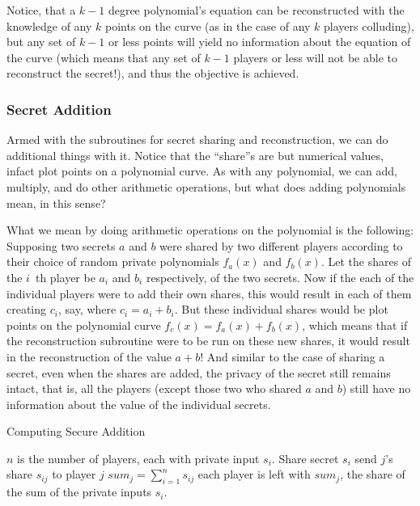 Notice, that
a $k-1$ degree polynomial's equation can be reconstructed with the knowledge
of any $k$ points on the curve (as in the case of any $k$ players colluding),
but any set of $k-1$ or less points will yield no information
about the equation of the curve (which means that any set of $k-1$ players
or less will not be able to reconstruct the secret!), and thus the objective
is achieved.

\subsubsection{Secret Addition}
\label{sec:add-prim}
Armed with the subroutines for secret sharing and reconstruction, we can
do additional things with it. Notice that the ``share''s are but 
numerical values, infact plot points on a polynomial curve. As with any 
polynomial, we can add, multiply, and do other arithmetic operations, but
what does adding polynomials mean, in this sense?

What we mean by doing arithmetic operations on the polynomial is the 
following:
Supposing two secrets $a$ and $b$ were shared by two different players
according to their choice of random private polynomials $f_{a}(x)$ and
$f_{b}(x)$. Let the shares of the $i$~th player be $a_i$ and $b_i$
respectively, of the two secrets. Now if the each of the individual players 
were to add their own shares, this would result in each of them creating
$c_i$, say, where $c_i = a_i + b_i$. But these individual shares 
would be plot points on the polynomial curve 
$f_{c}(x) = f_{a}(x) + f_{b}(x)$, which means that if the reconstruction
subroutine were to be run on these new shares, it would result in the 
reconstruction of the value $a+b$! And similar to the case of sharing 
a secret, even when the shares are added, the privacy of the secret still
remains intact, that is, all the players (except those two who shared $a$
and $b$) still have no information about the value of the individual secrets.

\begin{algorithm}
\caption{Computing Secure Addition}
\label{algadd}
\begin{algorithmic}
\REQUIRE $n$ is the number of players, each with private input $s_{i}$.
\STATE {}
	\STATE Share secret $s_{i}$
		\STATE send $j$'s share $s_{ij}$ to player $j$
	\ENDFOR
\ENDFOR
{}
	\STATE $sum_{j} = \sum_{i=1}^{n}s_{ij} $
\ENDFOR
\ENSURE each player is left with $sum_j$, the share of the sum of the private
inputs $s_{i}$.
\end{algorithmic}
\end{algorithm}

